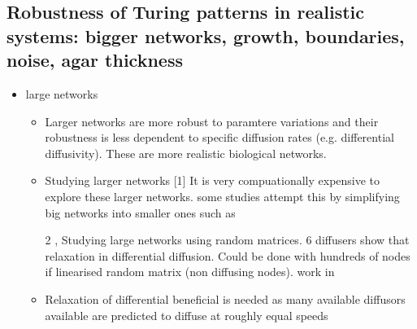 \subsection{Robustness of Turing patterns in realistic systems: bigger networks, growth, boundaries, noise, agar thickness}
\begin{itemize}
    \item large networks
    \begin{itemize}
      \item \parencite{Zheng2016, Scholes2019} Larger networks are more robust to paramtere variations and their robustness is less dependent to specific diffusion rates (e.g. differential diffusivity). These are more realistic biological networks.
      \item  \parencite{Smith2018a} Studying larger networks [1] It is very compuationally expensive to explore these larger networks. some studies attempt this by simplifying big networks into smaller ones such as ~\parencite{Smith2018a} %
        \item [2], Studying large networks using random matrices. 6 diffusers show that relaxation in differential diffusion. Could be done with hundreds of nodes if linearised random matrix (non diffusing nodes). work in ~\parencite{Haas2021}
        \item Relaxation of differential beneficial is needed as many available diffusors available are predicted to diffuse at roughly equal speeds ~\parencite{Kondo2010a, huidobro}
    \end{itemize}



\end{itemize}
